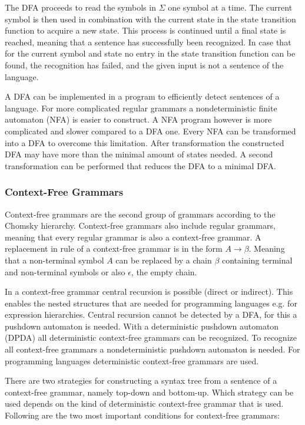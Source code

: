 The DFA proceeds to read the symbols in $\Sigma$ one symbol at a time. The current symbol is then used in combination with the current state in the state transition function to acquire a new state. This process is continued until a final state is reached, meaning that a sentence has successfully been recognized. In case that for the current symbol and state no entry in the state transition function can be found, the recognition has failed, and the given input is not a sentence of the language. 

A DFA can be implemented in a program to efficiently detect sentences of a language. For more complicated regular grammars a nondeterministic finite automaton (NFA) is easier to construct. A NFA program however is more complicated and slower compared to a DFA one. Every NFA can be transformed into a DFA to overcome this limitation. After transformation the constructed DFA may have more than the minimal amount of states needed. A second transformation can be performed that reduces the DFA to a minimal DFA. 

\subsubsection{Context-Free Grammars}

Context-free grammars are the second group of grammars according to the Chomsky hierarchy. Context-free grammars also include regular grammars, meaning that every regular grammar is also a context-free grammar. A replacement in rule of a context-free grammar is in the form $A \rightarrow \beta$. Meaning that a non-terminal symbol $A$ can be replaced by a chain $\beta$ containing terminal and non-terminal symbols or also $\epsilon$, the empty chain. 

In a context-free grammar central recursion is possible (direct or indirect). This enables the nested structures that are needed for programming languages e.g. for expression hierarchies. Central recursion cannot be detected by a DFA, for this a pushdown automaton is needed. With a deterministic pushdown automaton (DPDA) all deterministic context-free grammars can be recognized. To recognize all context-free grammars a nondeterministic pushdown automaton is needed. For programming languages deterministic context-free grammars are used. 

There are two strategies for constructing a syntax tree from a sentence of a context-free grammar, namely top-down and bottom-up. Which strategy can be used depends on the kind of deterministic context-free grammar that is used. Following are the two most important conditions for context-free grammars:

